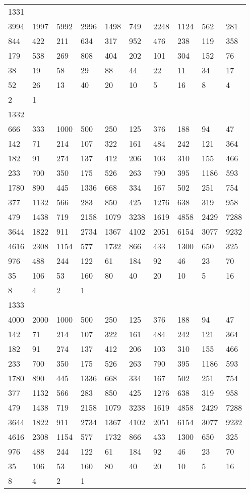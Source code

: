 \begin{longtable}{*{10}{l}}
1331&&&&&&&&&\\
3994& 1997& 5992& 2996& 1498& 749& 2248& 1124& 562& 281\\
844& 422& 211& 634& 317& 952& 476& 238& 119& 358\\
179& 538& 269& 808& 404& 202& 101& 304& 152& 76\\
38& 19& 58& 29& 88& 44& 22& 11& 34& 17\\
52& 26& 13& 40& 20& 10& 5& 16& 8& 4\\
2& 1& \\

1332&&&&&&&&&\\
666& 333& 1000& 500& 250& 125& 376& 188& 94& 47\\
142& 71& 214& 107& 322& 161& 484& 242& 121& 364\\
182& 91& 274& 137& 412& 206& 103& 310& 155& 466\\
233& 700& 350& 175& 526& 263& 790& 395& 1186& 593\\
1780& 890& 445& 1336& 668& 334& 167& 502& 251& 754\\
377& 1132& 566& 283& 850& 425& 1276& 638& 319& 958\\
479& 1438& 719& 2158& 1079& 3238& 1619& 4858& 2429& 7288\\
3644& 1822& 911& 2734& 1367& 4102& 2051& 6154& 3077& 9232\\
4616& 2308& 1154& 577& 1732& 866& 433& 1300& 650& 325\\
976& 488& 244& 122& 61& 184& 92& 46& 23& 70\\
35& 106& 53& 160& 80& 40& 20& 10& 5& 16\\
8& 4& 2& 1& \\

1333&&&&&&&&&\\
4000& 2000& 1000& 500& 250& 125& 376& 188& 94& 47\\
142& 71& 214& 107& 322& 161& 484& 242& 121& 364\\
182& 91& 274& 137& 412& 206& 103& 310& 155& 466\\
233& 700& 350& 175& 526& 263& 790& 395& 1186& 593\\
1780& 890& 445& 1336& 668& 334& 167& 502& 251& 754\\
377& 1132& 566& 283& 850& 425& 1276& 638& 319& 958\\
479& 1438& 719& 2158& 1079& 3238& 1619& 4858& 2429& 7288\\
3644& 1822& 911& 2734& 1367& 4102& 2051& 6154& 3077& 9232\\
4616& 2308& 1154& 577& 1732& 866& 433& 1300& 650& 325\\
976& 488& 244& 122& 61& 184& 92& 46& 23& 70\\
35& 106& 53& 160& 80& 40& 20& 10& 5& 16\\
8& 4& 2& 1& \\


\end{longtable}
